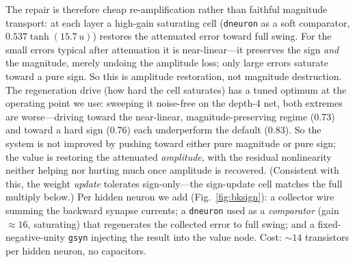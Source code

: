 \documentclass[11pt]{article}
\begin{document}
The repair is therefore cheap re-amplification rather than faithful magnitude transport: at each layer a high-gain saturating cell (\texttt{dneuron} as a soft comparator, $0.537\tanh(15.7\,u)$) restores the attenuated error toward full swing. For the small errors typical after attenuation it is near-linear---it preserves the sign \emph{and} the magnitude, merely undoing the amplitude loss; only large errors saturate toward a pure sign. So this is amplitude restoration, not magnitude destruction. The regeneration drive (how hard the cell saturates) has a tuned optimum at the operating point we use: sweeping it noise-free on the depth-4 net, both extremes are worse---driving toward the near-linear, magnitude-preserving regime ($0.73$) and toward a hard sign ($0.76$) each underperform the default ($0.83$). So the system is not improved by pushing toward either pure magnitude or pure sign; the value is restoring the attenuated \emph{amplitude}, with the residual nonlinearity neither helping nor hurting much once amplitude is recovered. (Consistent with this, the weight \emph{update} tolerates sign-only---the sign-update cell matches the full multiply below.) Per hidden neuron we add (Fig.~\ref{fig:bksign}): a collector wire summing the backward synapse currents; a \texttt{dneuron} used as a \emph{comparator} (gain ${\approx}16$, saturating) that regenerates the collected error to full swing; and a fixed-negative-unity \texttt{gsyn} injecting the result into the value node. Cost: ${\sim}14$ transistors per hidden neuron, no capacitors.
\end{document}
